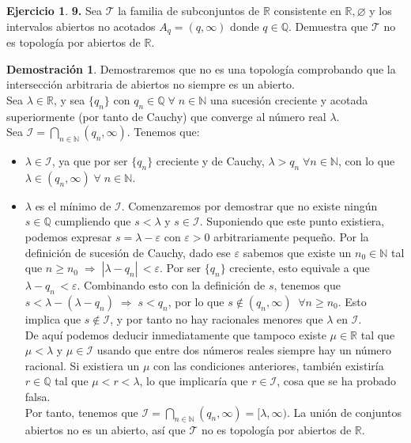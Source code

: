 \documentclass[12pt,twoside]{report}
\newcommand\mc[1]{\mathcal{#1}}
\theoremstyle{azul}
\theoremstyle{azul2}
\theoremstyle{plain}
\theoremstyle{definition}
\newtheorem*{dem}{Demostración}
\newtheorem*{ejern}{Ejercicio}
\theoremstyle{remark}
\begin{document}
\begin{ejern} \textbf{9.} Sea $\mc{T}$ la familia de subconjuntos de $\mathbb{R}$ consistente en $\mathbb{R}, \varnothing$ y los intervalos abiertos no acotados $A_q = (q,\infty)$ donde $q\in\mathbb{Q}$. Demuestra que $\mc{T}$ no es topología por abiertos de $\mathbb{R}$.

\begin{dem}
Demostraremos que no es una topología comprobando que la intersección arbitraria de abiertos no siempre es un abierto.\\
Sea $\lambda \in \mathbb{R}$, y sea $\{q_n\}$ con $q_n \in \mathbb{Q} \; \forall \; n \in \mathbb{N}$ una sucesión creciente y acotada superiormente (por tanto de Cauchy) que converge al número real  $\lambda$.\\
Sea $\mc{I} = \underset{n\in\mathbb{N}}{\bigcap} (q_n,\infty)$. Tenemos que: \vspace{-4mm}
\begin{itemize}
    \item $\lambda \in \mc{I}$, ya que por ser $\{q_n\}$ creciente y de Cauchy, $\lambda > q_n \; \forall n \in \mathbb{N}$, con lo que $\lambda \in (q_n,\infty) \; \forall \; n \in \mathbb{N}$.
    
    \item $\lambda$ es el mínimo de $\mc{I}$. Comenzaremos por demostrar que no existe ningún $s \in \mathbb{Q}$ cumpliendo que $s < \lambda$ y $s \in \mc{I}$. Suponiendo que este punto existiera, podemos expresar $s = \lambda - \varepsilon$ con $\varepsilon > 0$ arbitrariamente pequeño. Por la definición de sucesión de Cauchy, dado ese $\varepsilon$ sabemos que existe un $n_0 \in \mathbb{N}$ tal que $n \geq n_0 \; \Rightarrow \; |\lambda - q_n| \, < \varepsilon$. Por ser $\{q_n\}$ creciente, esto equivale a que $\lambda - q_n \, < \varepsilon$. Combinando esto con la definición de $s$, tenemos que $s < \lambda - (\lambda - q_n) \; \Rightarrow \; s < q_n$, por lo que $s \not\in (q_n, \infty) \;\; \forall n \geq n_0$. Esto implica que $s \not\in \mc{I}$, y por tanto no hay racionales menores que $\lambda$ en $\mc{I}$.\\
    De aquí podemos deducir inmediatamente que tampoco existe $\mu \in \mathbb{R}$ tal que $\mu < \lambda$ y $\mu \in \mc{I}$ usando que entre dos números reales siempre hay un número racional. Si existiera un $\mu$ con las condiciones anteriores, también existiría $r \in \mathbb{Q}$ tal que $\mu < r < \lambda$, lo que implicaría que $r \in \mc{I}$, cosa que se ha probado falsa.\\
    Por tanto, tenemos que $\mc{I} = \underset{n\in\mathbb{N}}{\bigcap} (q_n,\infty) = [\lambda,\infty)$. La unión de conjuntos abiertos no es un abierto, así que $\mc{T}$ no es topología por abiertos de $\mathbb{R}$.
\end{itemize}
\end{dem}
\end{ejern}
\newpage
\end{document}
